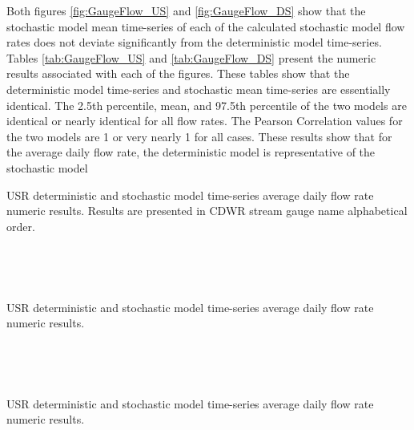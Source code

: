 Both figures \ref{fig:GaugeFlow_US} and \ref{fig:GaugeFlow_DS} show that the stochastic model mean time-series of each of the calculated stochastic model flow rates does not deviate significantly from the deterministic model time-series.  Tables \ref{tab:GaugeFlow_US} and \ref{tab:GaugeFlow_DS} present the numeric results associated with each of the figures.  These tables show that the deterministic model time-series and stochastic mean time-series are essentially identical.  The 2.5th percentile, mean, and 97.5th percentile of the two models are identical or nearly identical for all flow rates.  The Pearson Correlation values for the two models are 1 or very nearly 1 for all cases.  These results show that for the average daily flow rate, the deterministic model is representative of the stochastic model

\subtabletop
\begin{table}[htbp]
	\centering
	\caption[USR deterministic and stochastic model time-series average daily flow rate numeric results.]{USR deterministic and stochastic model time-series average daily flow rate numeric results.  Results are presented in CDWR stream gauge name alphabetical order.}
	\label{tab:GaugeFlow_US}
	\begin{subtable}{\textwidth}
		\centering
		
	\end{subtable}\\
	\tablevspace
	\begin{subtable}{\textwidth}
		\centering
		
	\end{subtable}\\
\end{table}
\subtablemid
\begin{table}[htbp]
	\centering
	\caption{USR deterministic and stochastic model time-series average daily flow rate numeric results.}
	\begin{subtable}{\textwidth}
		\centering
		
	\end{subtable}\\
	\tablevspace
	\begin{subtable}{\textwidth}
		\centering
		
	\end{subtable}\\
\end{table}	
\subtablemid
\begin{table}[htbp]
	\centering
	\caption{USR deterministic and stochastic model time-series average daily flow rate numeric results.}
	\begin{subtable}{\textwidth}
		\centering
		
	\end{subtable}\\
	\tablevspace
	\begin{subtable}{\textwidth}
		\centering
		
	\end{subtable}\\
\end{table}
